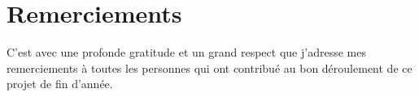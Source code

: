 \chapter*{Remerciements}

C'est avec une profonde gratitude et un grand respect que j'adresse mes remerciements à toutes les personnes qui ont contribué au bon déroulement de ce projet de fin d'année.